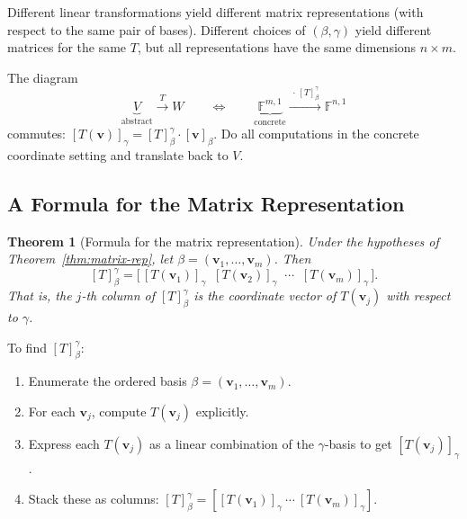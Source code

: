 \documentclass[11pt, a4paper, notitlepage]{report}
\newtheorem{theorem}{Theorem}[section]
\theoremstyle{definition}
\theoremstyle{remark}
\begin{document}
Different linear transformations yield different matrix representations (with respect to the same
pair of bases). Different choices of $(\beta, \gamma)$ yield different matrices for the same $T$,
but all representations have the same dimensions $n \times m$.

\begin{keyresult}[title={Key Result: Abstract $\to$ Concrete via Matrix Multiplication}]
The diagram
\[
  \underbrace{V}_{\text{abstract}} \xrightarrow{\ T \ } W
  \qquad \Longleftrightarrow \qquad
  \underbrace{\mathbb{F}^{m,1}}_{\text{concrete}} \xrightarrow{\ \cdot\,[T]_\beta^\gamma \ } \mathbb{F}^{n,1}
\]
commutes: $[T(\mathbf{v})]_\gamma = [T]_\beta^\gamma \cdot [\mathbf{v}]_\beta$.
Do all computations in the concrete coordinate setting and translate back to $V$.
\end{keyresult}

\subsection{A Formula for the Matrix Representation}

\begin{theorem}[Formula for the matrix representation]\label{thm:matrix-rep-formula}
Under the hypotheses of Theorem~\ref{thm:matrix-rep}, let $\beta = (\mathbf{v}_1, \ldots, \mathbf{v}_m)$.
Then
\[
  [T]_\beta^\gamma = \Big[\, [T(\mathbf{v}_1)]_\gamma \;\; [T(\mathbf{v}_2)]_\gamma \;\; \cdots \;\; [T(\mathbf{v}_m)]_\gamma \,\Big].
\]
That is, the $j$-th column of $[T]_\beta^\gamma$ is the coordinate vector of $T(\mathbf{v}_j)$
with respect to $\gamma$.
\end{theorem}

\begin{examtip}[title={Exam Tip: Computing a Matrix Representation}]
To find $[T]_\beta^\gamma$:
\begin{enumerate}
  \item Enumerate the ordered basis $\beta = (\mathbf{v}_1, \ldots, \mathbf{v}_m)$.
  \item For each $\mathbf{v}_j$, compute $T(\mathbf{v}_j)$ explicitly.
  \item Express each $T(\mathbf{v}_j)$ as a linear combination of the $\gamma$-basis to get $[T(\mathbf{v}_j)]_\gamma$.
  \item Stack these as columns: $[T]_\beta^\gamma = [[T(\mathbf{v}_1)]_\gamma\ \cdots\ [T(\mathbf{v}_m)]_\gamma]$.
\end{enumerate}
\end{examtip}
\end{document}
